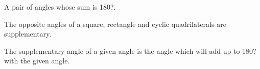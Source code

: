 A pair of angles whose sum is 180?.
\par
The opposite angles of a square, rectangle and cyclic quadrilaterals are 
supplementary.
\par
The supplementary angle of a given angle is the angle which will add up to 
180? with the given angle.